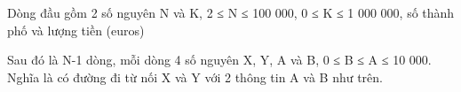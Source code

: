Dòng đầu gồm 2 số nguyên N và K, 2 ≤ N ≤ 100 000, 0 ≤ K ≤ 1 000 000, số thành phố và lượng tiền (euros)

Sau đó là N-1 dòng, mỗi dòng 4 số nguyên X, Y, A và B, 0 ≤ B ≤ A ≤ 10 000. Nghĩa là có đường đi từ nối X và Y với 2 thông tin A và B như trên.

\